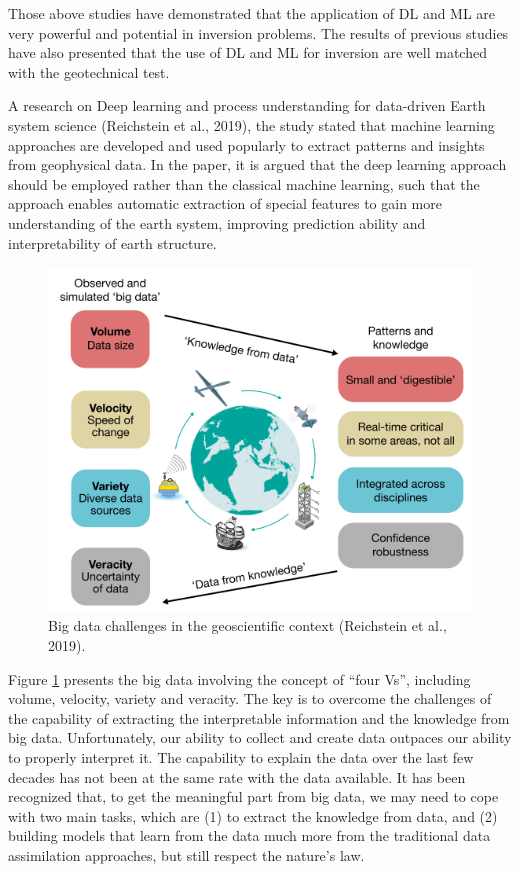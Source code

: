 Those above studies have demonstrated that the application of DL and ML are very powerful and potential in inversion problems. The results of previous studies have also presented that the use of DL and ML for inversion are well matched with the geotechnical test.

A research on Deep learning and process understanding for data-driven Earth system science (Reichstein et al., 2019), the study stated that machine learning approaches are developed and used popularly to extract patterns and insights from geophysical data. In the paper, it is argued that the deep learning approach should be employed rather than the classical machine learning, such that the approach enables automatic extraction of special features to gain more understanding of the earth system, improving prediction ability and interpretability of earth structure.

\begin{figure}
    \centering
    \includegraphics[scale=0.5]{images/bigdata.png}
    \caption{Big data challenges in the geoscientific context (Reichstein et al., 2019).}
    \label{fig:bigdata}
\end{figure}


Figure \ref{fig:bigdata} presents the big data involving the concept of “four Vs”, including volume, velocity, variety and veracity. The key is to overcome the challenges of the capability of extracting the interpretable information and the knowledge from big data. Unfortunately, our ability to collect and create data outpaces our ability to properly interpret it. The capability to explain the data over the last few decades has not been at the same rate with the data available. It has been recognized that, to get the meaningful part from big data, we may need to cope with two main tasks, which are (1) to extract the knowledge from data, and (2) building models that learn from the data much more from the traditional data assimilation approaches, but still respect the nature’s law.


